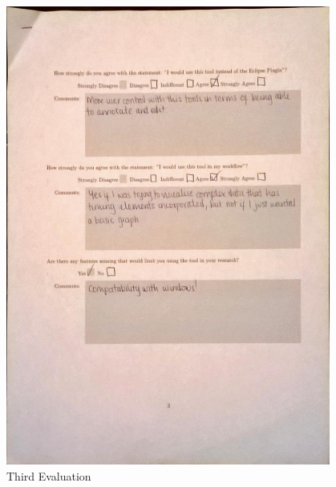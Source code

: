 \begin{figure}[h!]
    \centering
    \includegraphics[width=0.95\textwidth]{images/user_eval/user_eval_16.jpg}
    \caption{Third Evaluation}
\end{figure}

